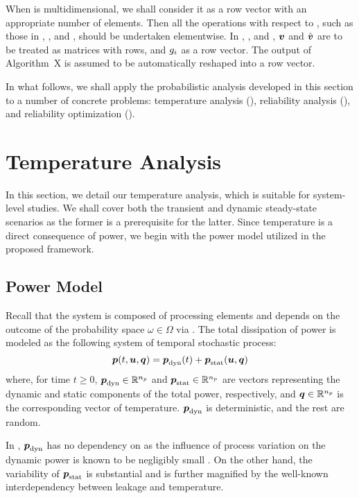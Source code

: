 \begin{remark}
When \g is multidimensional, we shall consider it as a row vector with an
appropriate number of elements. Then all the operations with respect to \g, such
as those in , , and
, should be undertaken elementwise. In
, , and
, $\boldsymbol{v}$ and $\hat{\boldsymbol{v}}$ are to be treated as
matrices with \nc rows, and $g_i$ as a row vector. The output of Algorithm~X is
assumed to be automatically reshaped into a row vector.
\end{remark}

In what follows, we shall apply the probabilistic analysis developed in this
section to a number of concrete problems: temperature analysis
(), reliability analysis
(), and reliability optimization
().

\section{Temperature Analysis}

In this section, we detail our temperature analysis, which is suitable for
system-level studies. We shall cover both the transient and dynamic steady-state
scenarios as the former is a prerequisite for the latter. Since temperature is a
direct consequence of power, we begin with the power model utilized in the
proposed framework.

\subsection{Power Model}

Recall that the system is composed of \np processing elements and depends on the
outcome of the probability space $\omega \in \Omega$ via \vu. The total
dissipation of power is modeled as the following system of \np temporal
stochastic process:
\[
  \boldsymbol{p}(t, \boldsymbol{u}, \boldsymbol{q}) = \boldsymbol{p}_{\mathrm{dyn}}(t) + \boldsymbol{p}_{\mathrm{stat}}(\boldsymbol{u}, \boldsymbol{q})
\]
where, for time $t \geq 0$, $\boldsymbol{p}_{\mathrm{dyn}} \in \mathbb{R}^{n_{p}}$ and $\boldsymbol{p}_{\mathrm{stat}} \in
\mathbb{R}^{n_{p}}$ are vectors representing the dynamic and static components of the
total power, respectively, and $\boldsymbol{q} \in \mathbb{R}^{n_{p}}$ is the corresponding vector
of temperature. $\boldsymbol{p}_{\mathrm{dyn}}$ is deterministic, and the rest are random.

\begin{remark}
In , \textnormal{$\boldsymbol{p}_{\mathrm{dyn}}$} has no dependency on \vu as
the influence of process variation on the dynamic power is known to be
negligibly small \cite{srivastava2010}. On the other hand, the variability of
\textnormal{$\boldsymbol{p}_{\mathrm{stat}}$} is substantial and is further magnified by the
well-known interdependency between leakage and temperature.
\end{remark}

